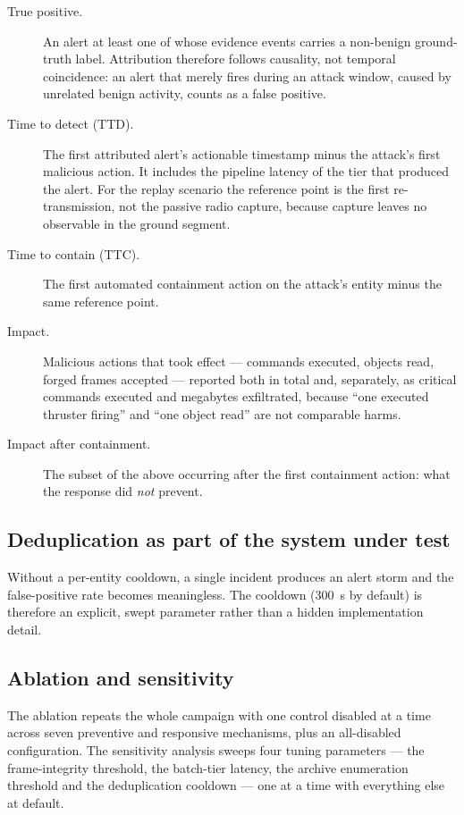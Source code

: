 \begin{description}
\item[True positive.] An alert at least one of whose evidence events carries a
non-benign ground-truth label. Attribution therefore follows causality, not
temporal coincidence: an alert that merely fires during an attack window, caused
by unrelated benign activity, counts as a false positive.
\item[Time to detect (TTD).] The first attributed alert's actionable timestamp
minus the attack's first malicious action. It includes the pipeline latency of
the tier that produced the alert. For the replay scenario the reference point is
the first re-transmission, not the passive radio capture, because capture leaves
no observable in the ground segment.
\item[Time to contain (TTC).] The first automated containment action on the
attack's entity minus the same reference point.
\item[Impact.] Malicious actions that took effect --- commands executed, objects
read, forged frames accepted --- reported both in total and, separately, as
critical commands executed and megabytes exfiltrated, because ``one executed
thruster firing'' and ``one object read'' are not comparable harms.
\item[Impact after containment.] The subset of the above occurring after the
first containment action: what the response did \emph{not} prevent.
\end{description}

\subsection{Deduplication as part of the system under test}

Without a per-entity cooldown, a single incident produces an alert storm and the
false-positive rate becomes meaningless. The cooldown (\SI{300}{\second} by
default) is therefore an explicit, swept parameter rather than a hidden
implementation detail.

\subsection{Ablation and sensitivity}

The ablation repeats the whole campaign with one control disabled at a time
across seven preventive and responsive mechanisms, plus an all-disabled
configuration. The sensitivity analysis sweeps four tuning parameters --- the
frame-integrity threshold, the batch-tier latency, the archive enumeration
threshold and the deduplication cooldown --- one at a time with everything else
at default.

